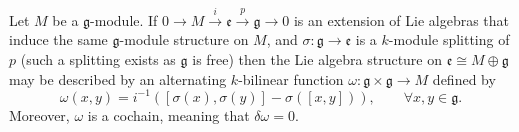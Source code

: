 \begin{lemma}
  Let $ M $ be a $ \mathfrak{g} $-module. If $ 0 \to M \xrightarrow{i} \mathfrak{e} \xrightarrow{p} \mathfrak{g} \to 0 $ is an extension of Lie algebras that induce the same $ \mathfrak{g} $-module structure on $ M $, and $ \sigma: \mathfrak{g} \to \mathfrak{e} $ is a $ k $-module splitting of $ p $ (such a splitting exists as $ \mathfrak{g} $ is free) then the Lie algebra structure on $ \mathfrak{e} \cong M \oplus \mathfrak{g} $ may be described by an alternating $ k $-bilinear function $ \omega: \mathfrak{g} \times \mathfrak{g} \to M $ defined by
  \begin{equation}
    \omega(x,y) = i^{-1}\left([\sigma(x), \sigma(y)] - \sigma \left( [x, y] \right)\right), \quad\quad \forall x,y \in \mathfrak{g}.
  \end{equation}
  Moreover, $ \omega $ is a cochain, meaning that $ \delta \omega = 0 $.
\end{lemma}
